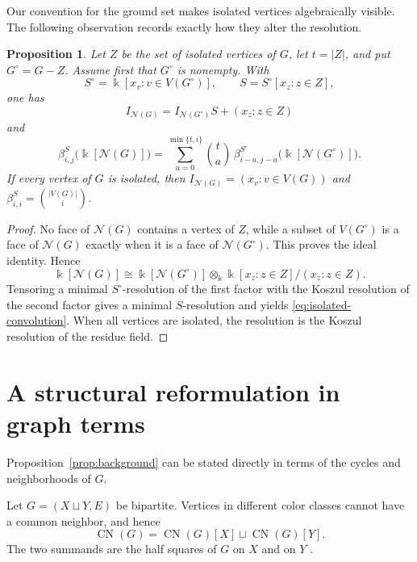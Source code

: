 \documentclass[11pt]{amsart}
\newtheorem{proposition}[theorem]{Proposition}
\theoremstyle{definition}
\theoremstyle{remark}
\numberwithin{equation}{section}
\newcommand{\NN}{\mathcal N}
\newcommand{\CN}{\operatorname{CN}}
\begin{document}
	Our convention for the ground set makes isolated vertices algebraically visible.
	The following observation records exactly how they alter the resolution.

	\begin{proposition}\label{prop:isolated-vertices}
		Let \(Z\) be the set of isolated vertices of \(G\), let \(t=|Z|\), and put
		\(G^{\circ}=G-Z\). Assume first that \(G^{\circ}\) is nonempty. With
		\[
		S^{\circ}=\Bbbk[x_v:v\in V(G^{\circ})],
		\qquad S=S^{\circ}[x_z:z\in Z],
		\]
		one has
		\[
		I_{\NN(G)}=I_{\NN(G^{\circ})}S+(x_z:z\in Z)
		\]
		and
		\begin{equation}\label{eq:isolated-convolution}
		\beta^{S}_{i,j}\bigl(\Bbbk[\NN(G)]\bigr)
		=
		\sum_{a=0}^{\min\{t,i\}}
		\binom ta\,
		\beta^{S^{\circ}}_{i-a,j-a}
		\bigl(\Bbbk[\NN(G^{\circ})]\bigr).
		\end{equation}
		If every vertex of \(G\) is isolated, then
		\(I_{\NN(G)}=(x_v:v\in V(G))\) and
		\(\beta^S_{i,i}=\binom{|V(G)|}{i}\).
	\end{proposition}

	\begin{proof}
		No face of \(\NN(G)\) contains a vertex of \(Z\), while a subset of
		\(V(G^{\circ})\) is a face of \(\NN(G)\) exactly when it is a face of
		\(\NN(G^{\circ})\). This proves the ideal identity. Hence
		\[
		\Bbbk[\NN(G)]
		\cong
		\Bbbk[\NN(G^{\circ})]
		\otimes_{\Bbbk}
		\Bbbk[x_z:z\in Z]/(x_z:z\in Z).
		\]
		Tensoring a minimal \(S^{\circ}\)-resolution of the first factor with the
		Koszul resolution of the second factor gives a minimal \(S\)-resolution and
		yields \eqref{eq:isolated-convolution}. When all vertices are isolated, the resolution is the Koszul resolution of
		the residue field.
	\end{proof}
	
	\section{A structural reformulation in graph terms}\label{sec:structure}
	
	Proposition~\ref{prop:background} can be stated directly in terms of the
	cycles and neighborhoods of \(G\).
	
	Let \(G=(X\sqcup Y,E)\) be bipartite. Vertices in different color classes
	cannot have a common neighbor, and hence
	\begin{equation}\label{eq:half-square-decomposition}
		\CN(G)=\CN(G)[X]\sqcup\CN(G)[Y].
	\end{equation}
	The two summands are the half squares of \(G\) on \(X\) and on \(Y\)
	\cite{LeLe2019}.
	
\end{document}
